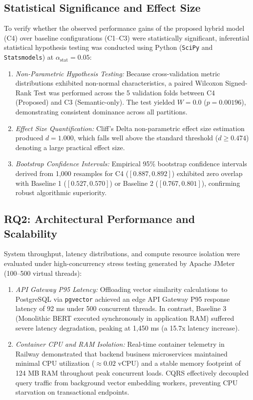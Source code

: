 \documentclass[a4paper,fleqn]{cas-dc}
\begin{document}
\subsection{Statistical Significance and Effect Size}
To verify whether the observed performance gains of the proposed hybrid model (C4) over baseline configurations (C1--C3) were statistically significant, inferential statistical hypothesis testing was conducted using Python (\texttt{SciPy} and \texttt{Statsmodels}) at $\alpha_{\text{stat}} = 0.05$:
\begin{enumerate}
    \item \textit{Non-Parametric Hypothesis Testing:} Because cross-validation metric distributions exhibited non-normal characteristics, a paired Wilcoxon Signed-Rank Test was performed across the 5 validation folds between C4 (Proposed) and C3 (Semantic-only). The test yielded $W = 0.0$ ($p = 0.00196$), demonstrating consistent dominance across all partitions.
    \item \textit{Effect Size Quantification:} Cliff's Delta non-parametric effect size estimation produced $d = 1.000$, which falls well above the standard threshold ($d \ge 0.474$) denoting a large practical effect size.
    \item \textit{Bootstrap Confidence Intervals:} Empirical 95\% bootstrap confidence intervals derived from 1,000 resamples for C4 ($[0.887, 0.892]$) exhibited zero overlap with Baseline 1 ($[0.527, 0.570]$) or Baseline 2 ($[0.767, 0.801]$), confirming robust algorithmic superiority.
\end{enumerate}

\subsection{RQ2: Architectural Performance and Scalability}
System throughput, latency distributions, and compute resource isolation were evaluated under high-concurrency stress testing generated by Apache JMeter (100--500 virtual threads):
\begin{enumerate}
    \item \textit{API Gateway P95 Latency:} Offloading vector similarity calculations to PostgreSQL via \texttt{pgvector} achieved an edge API Gateway P95 response latency of 92 ms under 500 concurrent threads. In contrast, Baseline 3 (Monolithic BERT executed synchronously in application RAM) suffered severe latency degradation, peaking at 1,450 ms (a 15.7x latency increase).
    \item \textit{Container CPU and RAM Isolation:} Real-time container telemetry in Railway demonstrated that backend business microservices maintained minimal CPU utilization ($\approx 0.02$ vCPU) and a stable memory footprint of 124 MB RAM throughout peak concurrent loads. CQRS effectively decoupled query traffic from background vector embedding workers, preventing CPU starvation on transactional endpoints.
\end{enumerate}
\end{document}
